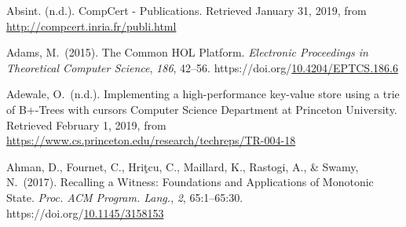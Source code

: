 \documentclass[12pt,twoside]{article}
\begin{document}
{\mdsupressbiblabel{}\begin{thebibliography}{222}%
\label{sec-bibliography}%

\mdbibitemlabel{}Absint. (n.d.). CompCert - Publications. Retrieved January 31, 2019, from \href{http://compcert.inria.fr/publi.html}{{\ttfamily http://\hspace{0pt}compcert.\hspace{0pt}inria.\hspace{0pt}fr/\hspace{0pt}publi.\hspace{0pt}html}}\label{absint_compcert_nodate}%

\mdbibitemlabel{}Adams, M.~(2015). The Common HOL Platform. \emph{Electronic Proceedings in Theoretical Computer Science}, \emph{186}, 42–56. https://doi.org/\href{https://dx.doi.org/10.4204/EPTCS.186.6}{10.4204/EPTCS.186.6}\label{adams_common_2015}%

\mdbibitemlabel{}Adewale, O.~(n.d.). Implementing a high-performance key-value store using a trie of B+-Trees with cursors \textbar{} Computer Science Department at Princeton University. Retrieved February 1, 2019, from \href{https://www.cs.princeton.edu/research/techreps/TR-004-18}{{\ttfamily https://\hspace{0pt}www.\hspace{0pt}cs.\hspace{0pt}princeton.\hspace{0pt}edu/\hspace{0pt}research/\hspace{0pt}techreps/\hspace{0pt}TR-\hspace{0pt}004-\hspace{0pt}18}}\label{adewale_implementing_nodate}%

\mdbibitemlabel{}Ahman, D., Fournet, C., Hriţcu, C., Maillard, K., Rastogi, A., \& Swamy, N.~(2017). Recalling a Witness: Foundations and Applications of Monotonic State. \emph{Proc. ACM Program. Lang.}, \emph{2}, 65:1–65:30. https://doi.org/\href{https://dx.doi.org/10.1145/3158153}{10.1145/3158153}\label{ahman_recalling_2017}%


\end{thebibliography}}
\end{document}
